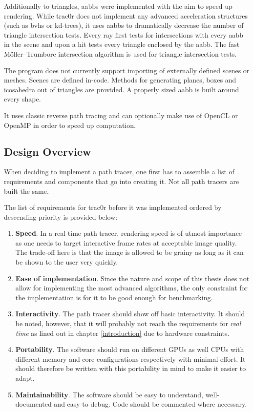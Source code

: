 \documentclass[
  twoside,
  11pt, a4paper,
  footinclude=true,
  headinclude=true,
  cleardoublepage=empty
]{scrreprt}
\begin{document}
Additionally to triangles, \acp{aabb} were implemented with the aim to speed up rendering. While
trac0r does not implement any advanced acceleration structures (such as \acp{bvh} or kd-trees),
it uses \acp{aabb} to
dramatically decrease the number of triangle intersection tests. Every ray first tests for
intersections with every \ac{aabb} in the scene and upon a hit tests every triangle enclosed by the
\ac{aabb}. The fast Möller–Trumbore intersection algorithm \cite{inproceedings:moller2005fast} is used for
triangle intersection tests.

The program does not currently support importing of externally defined scenes or meshes. Scenes are
defined in-code. Methods for generating planes, boxes and icosahedra out of triangles are
provided. A properly sized \ac{aabb} is built around every shape.

It uses classic reverse path tracing and can optionally make use of OpenCL or OpenMP in order to
speed up computation.

\subsection{Design Overview}
When deciding to implement a path tracer, one first has to assemble a list of requirements and
components that go into creating it. Not all path tracers are built the same.

The list of requirements for trac0r before it was implemented ordered by descending priority is
provided below:

\begin{enumerate}
    \item \textbf{Speed}. In a real time path tracer, rendering speed is of utmost importance as one needs
        to target interactive frame rates at acceptable image quality. The trade-off here is that
        the image is allowed to be grainy as long as it can be shown to the user very quickly.
    \item \textbf{Ease of implementation}. Since the nature and scope of this thesis does not allow for implementing
        the most advanced algorithms, the only constraint for the implementation is for it to be
        good enough for benchmarking.
    \item \textbf{Interactivity}. The path tracer should show off basic interactivity. It should be
        noted, however, that it will probably not reach the requirements for \emph{real time}
        as lined out in chapter \ref{introduction} due to hardware constraints.
    \item \textbf{Portability}. The software should run on different GPUs as well CPUs with different
        memory and core configurations respectively with minimal effort. It should therefore be
        written with this portability in mind to make it easier to adapt.
    \item \textbf{Maintainability}. The software should be easy to understand, well-documented and
        easy to debug. Code should be commented where necessary.
\end{enumerate}
\end{document}
